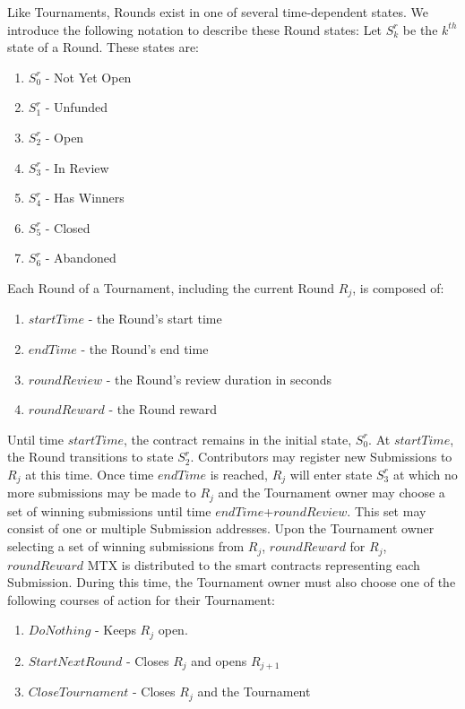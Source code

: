\documentclass[a4paper, 10pt, conference]{ieeeconf}      %
\begin{document}
Like Tournaments, Rounds exist in one of several time-dependent states. We introduce the following notation to describe these Round states: Let $S_k^r$ be the $k^{th}$ state of a Round. These states are:

\begin{enumerate}
\item $S_{0}^r$ - Not Yet Open
\item $S_{1}^r$ - Unfunded
\item $S_{2}^r$ - Open
\item $S_{3}^r$ - In Review
\item $S_{4}^r$ - Has Winners
\item $S_{5}^r$ - Closed
\item $S_{6}^r$ - Abandoned
\end{enumerate}
\bigskip

Each Round of a Tournament, including the current Round $R_j$, is composed of:

\begin{enumerate}
    \item $startTime$ - the Round's start time
    \item $endTime$ - the Round's end time
    \item $roundReview$ - the Round's review duration in seconds
    \item $roundReward$ - the Round reward
\end{enumerate}
Until time $startTime$, the contract remains in the initial state, $S_{0}^r$. At $startTime$, the Round transitions to state $S_{2}^r$. Contributors may register new Submissions to $R_j$ at this time.
Once time $endTime$ is reached, $R_j$ will enter state $S_{3}^r$ at which no more submissions may be made to $R_j$ and the Tournament owner may choose a set of winning submissions  until time $endTime$+$roundReview$. This set may consist of one or multiple Submission addresses.
Upon the Tournament owner selecting a set of winning submissions from $R_j$, $roundReward$ for $R_j$, $roundReward$ MTX is distributed to the smart contracts representing each Submission. During this time, the Tournament owner must also choose one of the following courses of action for their Tournament:
\begin{enumerate}
\item $DoNothing$ - Keeps $R_j$ open. 
\item $StartNextRound$ - Closes $R_j$ and opens $R_{j+1}$
\item $CloseTournament$ - Closes $R_j$ and the Tournament
\end{enumerate}
\end{document}
